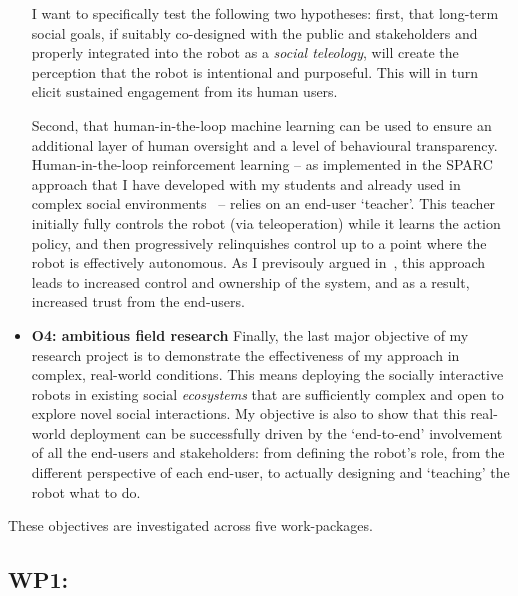 \begin{itemize}
        I want to specifically test the following two hypotheses: first, that
        long-term social goals, if suitably co-designed with the public and
        stakeholders and properly integrated into the robot as a \emph{social
        teleology}, will create the perception that the robot is intentional and
        purposeful. This will in turn elicit sustained engagement from its human
        users.

        Second, that human-in-the-loop machine learning can be used to ensure an
        additional layer of human oversight and a level of behavioural
        transparency.  Human-in-the-loop reinforcement learning -- as
        implemented in the SPARC approach that I have developed with my students
        and already used in complex social
        environments~\parencite{senft2017supervised,senft2019teaching,winkle2020insitu}
        -- relies on an end-user `teacher'. This teacher initially fully
        controls the robot (via teleoperation) while it learns the action
        policy, and then progressively relinquishes control up to a point where
        the robot is effectively autonomous. As I previsouly argued
        in~\textcite{senft2019teaching}, this approach leads to increased
        control and ownership of the system, and as a result, increased trust
        from the end-users.


    \item{\bf O4: ambitious field research} Finally, the last major objective of
        my research project is to demonstrate the effectiveness of my approach
        in complex, real-world conditions. This means deploying the socially
        interactive robots in existing social \emph{ecosystems} that are
        sufficiently complex and open to explore novel social interactions. My
        objective is also to show that this real-world deployment can be
        successfully driven by the `end-to-end' involvement of all the end-users
        and stakeholders: from defining the robot's role, from the different
        perspective of each end-user, to actually designing and `teaching' the
        robot what to do.


\end{itemize}


These objectives are investigated across five work-packages.

\subsection{WP1: \textbf{\wpOne}}

